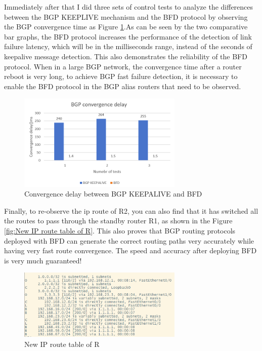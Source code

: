 \documentclass[12pt]{article}
\begin{document}
Immediately after that I did three sets of control tests to analyze the differences between the BGP KEEPLIVE mechanism and the BFD protocol by observing the BGP convergence time as Figure \ref{fig:Convergence delay between BGP KEEPALIVE and BFD}.As can be seen by the two comparative bar graphs, the BFD protocol increases the performance of the detection of link failure latency, which will be in the milliseconds range, instead of the seconds of keepalive message detection. This also demonstrates the reliability of the BFD protocol. When in a large BGP network, the convergence time after a router reboot is very long, to achieve BGP fast failure detection, it is necessary to enable the BFD protocol in the BGP alias routers that need to be observed.

\begin{figure}[h]
    \centering
    \includegraphics[width=0.7\textwidth,keepaspectratio]{Graph/BGP vs BFD.png}
    \caption{Convergence delay between BGP KEEPALIVE and BFD} 
    \label{fig:Convergence delay between BGP KEEPALIVE and BFD} 
\end{figure}

Finally, to re-observe the ip route of R2, you can also find that it has switched all the routes to pass through the standby router R1, as shown in the Figure \ref{fig:New IP route table of R}. This also proves that BGP routing protocols deployed with BFD can generate the correct routing paths very accurately while having very fast route convergence. The speed and accuracy after deploying BFD is very much guaranteed!

\begin{figure}[h]
    \centering
    \includegraphics[width=0.7\textwidth,keepaspectratio]{Graph/IP route throught R1.png}
    \caption{New IP route table of R} 
    \label{fig:New IP route table of R2} 
\end{figure}
\end{document}
